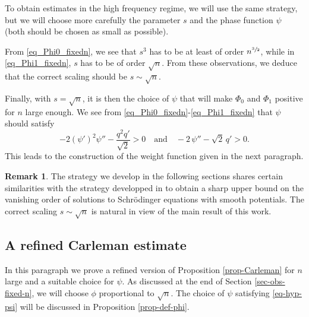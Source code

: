 \documentclass[10pt]{amsart}
\theoremstyle{plain}
\theoremstyle{definition}
\newtheorem{remark}[theorem]{Remark}
\newcommand{\1}{\mathds 1}
\let\vf\phi
\begin{document}
To obtain estimates in the high frequency regime, we will use the same strategy, but we will choose more carefully the parameter $s$ and the phase function $\psi$ (both should be chosen as small as possible).

From \eqref{eq_Phi0_fixedn}, we see that $s^3$ has to be at least of order $n^{\sfrac{3}{2}}$, while in \eqref{eq_Phi1_fixedn}, $s$
has to be of order $\sqrt n$. From these observations, we deduce that the correct scaling should be $s \sim \sqrt n$.

Finally, with $s = \sqrt n$, it is then the choice of $\psi$ that will make $\Phi_0$ and $\Phi_1$ positive for $n$ large enough.
We see from \eqref{eq_Phi0_fixedn}-\eqref{eq_Phi1_fixedn} that $\psi$ should satisfy
\begin{equation} \label{eq-hyp-psi}
-2 (\psi')^2 \psi'' - \frac{q^2q'}{\sqrt{2}} > 0 \quad \text{and} \quad - 2\,\psi'' - \sqrt{2}\, q' >0.
\end{equation}
This leads to the construction of the weight function given in the next paragraph.

\begin{remark}
The strategy we develop in the following sections shares certain similarities with the strategy developped in \cite{Bakri12} to obtain a sharp upper bound on the vanishing order of solutions to Schrödinger equations with smooth potentials. The correct scaling $s \sim \sqrt n$ is natural in view of the main result of this work.
\end{remark}

\subsection{A refined Carleman estimate}

In this paragraph we prove a refined version of Proposition \ref{prop-Carleman} for $n$ large and a suitable choice for $\psi$. As discussed at the end of Section \ref{sec-obs-fixed-n}, we will choose $\vf$ proportional to $\sqrt n$. The choice of $\psi$ satisfying \eqref{eq-hyp-psi} will be discussed in Proposition \ref{prop-def-phi}.
\end{document}
